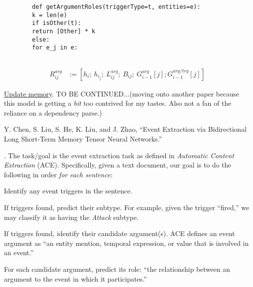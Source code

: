 \documentclass[11pt]{article}
\begin{document}
\begin{compactitem}[-]
\begin{compactenum}
		\lstset{language=Python}
		\begin{lstlisting}
		def getArgumentRoles(triggerType=t, entities=e):
		k = len(e)
		if isOther(t):
		return [Other] * k 
		else:
		for e_j in e:
		
		\end{lstlisting}
		
		\begin{align}
		R_{ij}^{arg} &:= \left[ h_i;~ h_{i_j};~ L_{ij}^{arg};~ B_{ij};~ G_{i-1}^{arg}[j]; G_{i-1}^{arg/trg}[j] \right]
		\end{align}
		
		\item \underline{Update memory}. TO BE CONTINUED...(moving onto another paper because this model is getting a \textit{bit} too contrived for my tastes. Also not a fan of the reliance on a dependency parse.)
	\end{compactenum}
\end{compactitem}


\begin{comment}
\lecture{Miscellaneous}{Zero-Shot Learning for Event Extraction}{Oct 31, 2017}

\vspace{-1em}
{\footnotesize L. Huang, H. Ji, K. Cho, and C. Voss, ``Zero-Shot Learning for Event Extraction,'' (2017).}
\end{comment}




\vspace{-1em}
{\footnotesize Y. Chen, S. Liu, S. He, K. Liu, and J. Zhao, ``Event Extraction via Bidirectional Long Short-Term Memory Tensor Neural Networks.''}

\p {}. The task/goal is the event extraction task as defined in \textit{Automatic Content Extraction} (ACE). Specifically, given a text document, our goal is to do the following in order \textit{for each sentence}:
\begin{compactenum}
	\item Identify any event triggers in the sentence.
	\item If triggers found, predict their subtype. For example, given the trigger ``fired,'' we may classify it as having the \textit{Attack} subtype.
	\item If triggers found, identify their candidate argument(s). ACE defines an event argument as ``an entity mention, temporal expression, or value that is involved in an event.''
	\item For each candidate argument, predict its role: ``the relationship between an argument to the event in which it participates.''
\end{compactenum}
\end{document}
